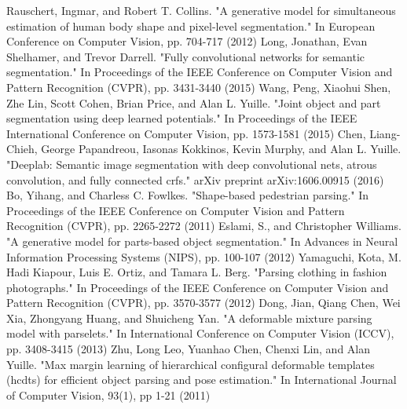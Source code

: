 \begin{thebibliography}{}
%
%
%
Rauschert, Ingmar, and Robert T. Collins. "A generative model for simultaneous estimation of human body shape and pixel-level segmentation." In European Conference on Computer Vision, pp. 704-717 (2012)
Long, Jonathan, Evan Shelhamer, and Trevor Darrell. "Fully convolutional networks for semantic segmentation." In Proceedings of the IEEE Conference on Computer Vision and Pattern Recognition (CVPR), pp. 3431-3440 (2015)
Wang, Peng, Xiaohui Shen, Zhe Lin, Scott Cohen, Brian Price, and Alan L. Yuille. "Joint object and part segmentation using deep learned potentials." In Proceedings of the IEEE International Conference on Computer Vision, pp. 1573-1581 (2015)
Chen, Liang-Chieh, George Papandreou, Iasonas Kokkinos, Kevin Murphy, and Alan L. Yuille. "Deeplab: Semantic image segmentation with deep convolutional nets, atrous convolution, and fully connected crfs." arXiv preprint arXiv:1606.00915 (2016)
Bo, Yihang, and Charless C. Fowlkes. "Shape-based pedestrian parsing." In Proceedings of the IEEE Conference on Computer Vision and Pattern Recognition (CVPR), pp. 2265-2272 (2011)
Eslami, S., and Christopher Williams. "A generative model for parts-based object segmentation." In Advances in Neural Information Processing Systems (NIPS), pp. 100-107 (2012)
Yamaguchi, Kota, M. Hadi Kiapour, Luis E. Ortiz, and Tamara L. Berg. "Parsing clothing in fashion photographs." In Proceedings of the IEEE Conference on Computer Vision and Pattern Recognition (CVPR), pp. 3570-3577 (2012)
Dong, Jian, Qiang Chen, Wei Xia, Zhongyang Huang, and Shuicheng Yan. "A deformable mixture parsing model with parselets." In International Conference on Computer Vision (ICCV), pp. 3408-3415 (2013)
Zhu, Long Leo, Yuanhao Chen, Chenxi Lin, and Alan Yuille. "Max margin learning of hierarchical configural deformable templates (hcdts) for efficient object parsing and pose estimation." In International Journal of Computer Vision, 93(1), pp 1-21 (2011)

\end{thebibliography}
